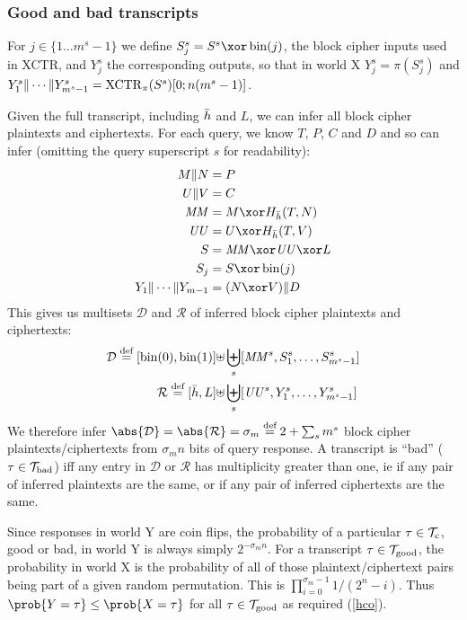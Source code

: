 \documentclass[hctr2.tex]{subfiles}
\begin{document}
\subsubsection{Good and bad transcripts}
For \(j \in \{1 \ldots m^s-1\}\) we define \(S_j^s = S^s \xor \fromint(j)\),
the block cipher inputs used in XCTR, and \(Y_j^s\) the corresponding
outputs, so that in world X \(Y_j^s = \pi(S_j^s)\) and 
\(Y_1^s \Vert \cdots \Vert Y_{m^s-1}^s = \operatorname{XCTR}_\pi(S^s)[0;n(m^s -1)]\).

Given the full transcript, including \(\bar{h}\) and \(L\),
we can infer all block cipher plaintexts and ciphertexts.
For each query, we know \(T\), \(P\), \(C\) and \(D\)
and so can infer
(omitting the query superscript \(s\) for readability):
\begin{align*}
    M \Concat N &= P \\
    U \Concat V &= C \\
    \MM &= M \xor H_{\hgen}(T, N)\\
    \UU &= U \xor H_{\hgen}(T, V)\\
    S &= \MM \xor \UU \xor L\\ 
    S_j &= S \xor \fromint(j)\\
    Y_1 \Concat \cdots \Concat Y_{m-1} &= (N \xor V) \Concat D
\end{align*}
This gives us multisets \(\mathcal{D}\) and \(\mathcal{R}\)
of inferred block cipher plaintexts and ciphertexts:
\begin{align*}
    \mathcal{D} \stackrel{\text{def}}{=} [\operatorname{bin}(0), \operatorname{bin}(1)] \uplus &
    \biguplus_s [\mathit{MM}^s, S_1^s, \ldots, S_{m^s-1}^s]\\
    \mathcal{R} \stackrel{\text{def}}{=} [\bar{h}, L] \uplus &
    \biguplus_s [\mathit{UU}^s, Y_1^s, \ldots, Y_{m^s-1}^s]
\end{align*}
We therefore infer
\(\abs{\mathcal{D}} = \abs{\mathcal{R}} = \sigma_m \defeq 2 + \sum_s m^s\)
block cipher plaintexts/ciphertexts
from \(\sigma_m n\) bits of query response.
A transcript is ``bad'' (\(\tau \in \mathcal{T}_\mathrm{bad}\))
iff any entry in \(\mathcal{D}\) or \(\mathcal{R}\)
has multiplicity greater than one,
ie if any pair of inferred plaintexts are the same, or
if any pair of inferred ciphertexts are the same.

Since responses in world Y are coin flips,
the probability of a 
particular \(\tau \in \mathcal{T}_\mathrm{c}\), good or bad,
in world Y is always simply \(2^{-\sigma_m n}\).
For a transcript \(\tau \in \mathcal{T}_\mathrm{good}\),
the probability in world X
is the probability of all of those plaintext/ciphertext
pairs being part of a given random permutation.
This is 
\(\prod_{i=0}^{\sigma_m -1}1/(2^n - i)\).
Thus \(\prob{Y = \tau} \leq \prob{X = \tau}\)
for all \(\tau \in \mathcal{T}_\mathrm{good}\) as required (\autoref{hco}).
\end{document}
